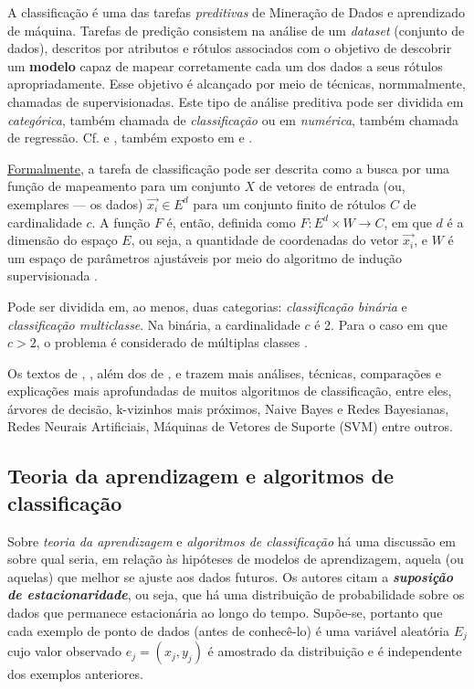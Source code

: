 A classificação é uma das tarefas \textit{preditivas} de Mineração de Dados e aprendizado de máquina. Tarefas de predição consistem na análise de um \textit{dataset} (conjunto de dados), descritos por atributos e rótulos associados com o objetivo de descobrir um \textbf{modelo} capaz de mapear corretamente cada um dos dados a seus rótulos apropriadamente. Esse objetivo é alcançado por meio de técnicas, normmalmente, chamadas de supervisionadas. Este tipo de análise preditiva pode ser dividida em \textit{categórica}, também chamada de \textit{classificação} ou em \textit{numérica}, também chamada de regressão. Cf.   e , também exposto em  e .

\underline{Formalmente}, a tarefa de classificação pode ser descrita como a busca por uma função de mapeamento para um conjunto $X$ de vetores de entrada (ou, exemplares --- os dados) $\vec{x_i} \in E^d$ para um conjunto finito de rótulos $C$ de cardinalidade $c$. A função $F$ é, então, definida como $F: E^d \times W \rightarrow C$, em que $d$ é a dimensão do espaço $E$, ou seja, a quantidade de coordenadas do vetor $\vec{x_i}$, e $W$ é um espaço de parâmetros ajustáveis por meio do algoritmo de indução supervisionada \cite{Boscarioli2017}.

Pode ser dividida em, ao menos, duas categorias: \textit{classificação binária} e \textit{classificação multiclasse}. Na binária, a cardinalidade $c$ é 2. Para o caso em que $c > 2$, o problema é considerado de múltiplas classes \cite{Boscarioli2017} \cite{classification2013}.

Os textos de , , além dos de ,  e   trazem mais análises, técnicas, comparações e explicações mais aprofundadas de muitos algoritmos de classificação, entre eles, árvores de decisão, k-vizinhos mais próximos, Naive Bayes e Redes Bayesianas, Redes Neurais Artificiais, Máquinas de Vetores de Suporte (SVM) entre outros.   

\subsection{Teoria da aprendizagem e algoritmos de classificação }\label{sec:teoria_aprendizagem}
Sobre \textit{teoria da aprendizagem} e \textit{algoritmos de classificação} há uma discussão em  sobre qual seria, em relação às hipóteses de modelos de aprendizagem, aquela (ou aquelas) que melhor se ajuste aos dados futuros. Os autores citam a \textbf{\textit{suposição de estacionaridade}}, ou seja, que há uma distribuição de probabilidade sobre os dados que permanece estacionária ao longo do tempo. Supõe-se, portanto que cada exemplo de ponto de dados (antes de conhecê-lo) é uma variável aleatória $E_j$ cujo valor observado $e_j = (x_j, y_j)$ é amostrado da distribuição e é independente dos exemplos anteriores. 

